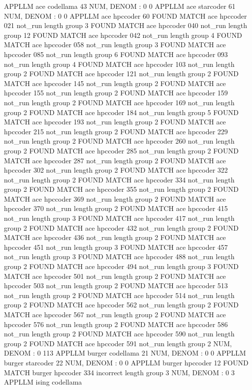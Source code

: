 APPLLM ace codellama
43
NUM, DENOM : 0 0
APPLLM ace starcoder
61
NUM, DENOM : 0 0
APPLLM ace hpccoder
60
FOUND MATCH ace hpccoder 021 not_run
length group  3
FOUND MATCH ace hpccoder 040 not_run
length group  12
FOUND MATCH ace hpccoder 042 not_run
length group  4
FOUND MATCH ace hpccoder 058 not_run
length group  3
FOUND MATCH ace hpccoder 085 not_run
length group  6
FOUND MATCH ace hpccoder 093 not_run
length group  4
FOUND MATCH ace hpccoder 103 not_run
length group  2
FOUND MATCH ace hpccoder 121 not_run
length group  2
FOUND MATCH ace hpccoder 145 not_run
length group  2
FOUND MATCH ace hpccoder 155 not_run
length group  2
FOUND MATCH ace hpccoder 159 not_run
length group  2
FOUND MATCH ace hpccoder 169 not_run
length group  2
FOUND MATCH ace hpccoder 184 not_run
length group  5
FOUND MATCH ace hpccoder 193 not_run
length group  2
FOUND MATCH ace hpccoder 215 not_run
length group  2
FOUND MATCH ace hpccoder 229 not_run
length group  2
FOUND MATCH ace hpccoder 260 not_run
length group  2
FOUND MATCH ace hpccoder 285 not_run
length group  2
FOUND MATCH ace hpccoder 287 not_run
length group  2
FOUND MATCH ace hpccoder 302 not_run
length group  2
FOUND MATCH ace hpccoder 322 not_run
length group  2
FOUND MATCH ace hpccoder 334 not_run
length group  2
FOUND MATCH ace hpccoder 355 not_run
length group  2
FOUND MATCH ace hpccoder 369 not_run
length group  2
FOUND MATCH ace hpccoder 370 not_run
length group  2
FOUND MATCH ace hpccoder 415 not_run
length group  3
FOUND MATCH ace hpccoder 417 not_run
length group  2
FOUND MATCH ace hpccoder 432 not_run
length group  2
FOUND MATCH ace hpccoder 436 not_run
length group  2
FOUND MATCH ace hpccoder 451 not_run
length group  3
FOUND MATCH ace hpccoder 457 not_run
length group  3
FOUND MATCH ace hpccoder 488 not_run
length group  2
FOUND MATCH ace hpccoder 494 not_run
length group  3
FOUND MATCH ace hpccoder 501 not_run
length group  2
FOUND MATCH ace hpccoder 503 not_run
length group  2
FOUND MATCH ace hpccoder 513 not_run
length group  2
FOUND MATCH ace hpccoder 514 not_run
length group  2
FOUND MATCH ace hpccoder 562 not_run
length group  2
FOUND MATCH ace hpccoder 567 not_run
length group  2
FOUND MATCH ace hpccoder 576 not_run
length group  2
FOUND MATCH ace hpccoder 586 not_run
length group  2
FOUND MATCH ace hpccoder 590 not_run
length group  2
FOUND MATCH ace hpccoder 591 not_run
length group  2
NUM, DENOM : 0 113
APPLLM burger codellama
21
NUM, DENOM : 0 0
APPLLM burger starcoder
22
NUM, DENOM : 0 0
APPLLM burger hpccoder
12
FOUND MATCH burger hpccoder 334 incorrect
length group  3
NUM, DENOM : 0 3
APPLLM ising codellama
